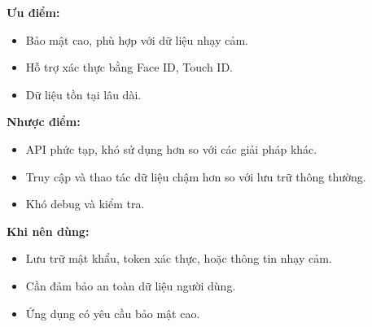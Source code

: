 \textbf{Ưu điểm:}
\begin{itemize}
    \item Bảo mật cao, phù hợp với dữ liệu nhạy cảm.
    \item Hỗ trợ xác thực bằng Face ID, Touch ID.
    \item Dữ liệu tồn tại lâu dài.
\end{itemize}
\textbf{Nhược điểm:} \begin{itemize} \item API phức tạp, khó sử dụng hơn so với các giải pháp khác. \item Truy cập và thao tác dữ liệu chậm hơn so với lưu trữ thông thường. \item Khó debug và kiểm tra. \end{itemize}

\textbf{Khi nên dùng:} \begin{itemize} \item Lưu trữ mật khẩu, token xác thực, hoặc thông tin nhạy cảm. \item Cần đảm bảo an toàn dữ liệu người dùng. \item Ứng dụng có yêu cầu bảo mật cao. \end{itemize}
